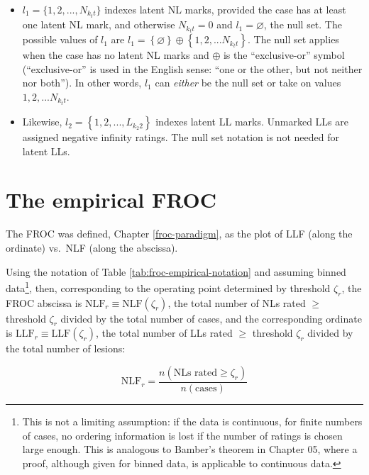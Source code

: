 \documentclass[
]{book}
\begin{document}
\begin{itemize}
\item
  \(l_1 = \{1, 2, ..., N_{k_t t}\}\) indexes latent NL marks, provided the case has at least one latent NL mark, and otherwise \(N_{k_t t} = 0\) and \(l_1 = \varnothing\), the null set. The possible values of \(l_1\) are \(l_1 = \left \{ \varnothing \right \}\oplus \left \{ 1,2,...N_{k_t t} \right \}\). The null set applies when the case has no latent NL marks and \(\oplus\) is the ``exclusive-or'' symbol (``exclusive-or'' is used in the English sense: ``one or the other, but not neither nor both''). In other words, \(l_1\) can \emph{either} be the null set or take on values \(1,2,...N_{k_t t}\).
\item
  Likewise, \(l_2 = \left \{ 1,2,...,L_{k_2 2} \right \}\) indexes latent LL marks. Unmarked LLs are assigned negative infinity ratings. The null set notation is not needed for latent LLs.
\end{itemize}

\hypertarget{froc-empirical-froc-plot}{%
\section{The empirical FROC}\label{froc-empirical-froc-plot}}

The FROC was defined, Chapter \ref{froc-paradigm}, as the plot of LLF (along the ordinate) vs.~NLF (along the abscissa).

Using the notation of Table \ref{tab:froc-empirical-notation} and assuming binned data\footnote{This is not a limiting assumption: if the data is continuous, for finite numbers of cases, no ordering information is lost if the number of ratings is chosen large enough. This is analogous to Bamber's theorem in Chapter 05, where a proof, although given for binned data, is applicable to continuous data.}, then, corresponding to the operating point determined by threshold \(\zeta_r\), the FROC abscissa is \(\text{NLF}_r \equiv \text{NLF}\left ( \zeta_r \right )\), the total number of NLs rated \(\geq\) threshold \(\zeta_r\) divided by the total number of cases, and the corresponding ordinate is \(\text{LLF}_r \equiv \text{LLF}\left ( \zeta_r \right )\), the total number of LLs rated \(\geq\) threshold \(\zeta_r\) divided by the total number of lesions:

\begin{equation}
\text{NLF}_r  = \frac{n\left ( \text{NLs rated} \geq \zeta_r\right )}{n\left ( \text{cases} \right )}
\label{eq:froc-empirical-NLF1}
\end{equation}
\end{document}
